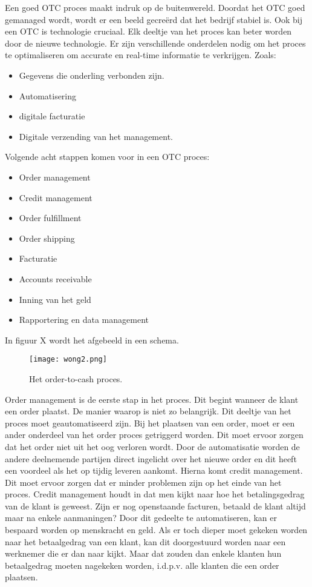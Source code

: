 Een goed OTC proces maakt indruk op de buitenwereld. Doordat het OTC goed gemanaged wordt, wordt er een beeld gecreërd dat het bedrijf stabiel is. 
Ook bij een OTC is technologie cruciaal. Elk deeltje van het proces kan beter worden door de nieuwe technologie. Er zijn verschillende onderdelen nodig om het proces te optimaliseren om accurate en real-time informatie te verkrijgen. Zoals: 
\begin{itemize}
	\item Gegevens die onderling verbonden zijn.
	\item Automatisering
	\item digitale facturatie
	\item Digitale verzending van het management.
\end{itemize}

Volgende acht stappen komen voor in een OTC proces:
\begin{itemize}
	\item Order management
	\item Credit management
	\item Order fulfillment
	\item Order shipping
	\item Facturatie
	\item Accounts receivable
	\item Inning van het geld
	\item Rapportering en data management
\end{itemize}
In figuur X wordt het afgebeeld in een schema.
\begin{figure}[h]
	\texttt{[image: wong2.png]}
	\caption{Het order-to-cash proces. \textcite{Wong2018}}
	\centering
\end{figure}
Order management is de eerste stap in het proces. Dit begint wanneer de klant een order plaatst. De manier waarop is niet zo belangrijk. Dit deeltje van het proces moet geautomatiseerd zijn. Bij het plaatsen van een order, moet er een ander onderdeel van het order proces getriggerd worden. Dit moet ervoor zorgen dat het order niet uit het oog verloren wordt. Door de automatisatie worden de andere deelnemende partijen direct ingelicht over het nieuwe order en dit heeft een voordeel als het op tijdig leveren aankomt.
Hierna komt credit management. Dit moet ervoor zorgen dat er minder problemen zijn op het einde van het proces. Credit management houdt in dat men kijkt naar hoe het betalingsgedrag van de klant is geweest. Zijn er nog openstaande facturen, betaald de klant altijd maar na enkele aanmaningen? Door dit gedeelte te automatiseren, kan er bespaard worden op menskracht en geld. Als er toch dieper moet gekeken worden naar het betaalgedrag van een klant, kan dit doorgestuurd worden naar een werknemer die er dan naar kijkt. Maar dat zouden dan enkele klanten hun betaalgedrag moeten nagekeken worden, i.d.p.v. alle klanten die een order plaatsen. 
